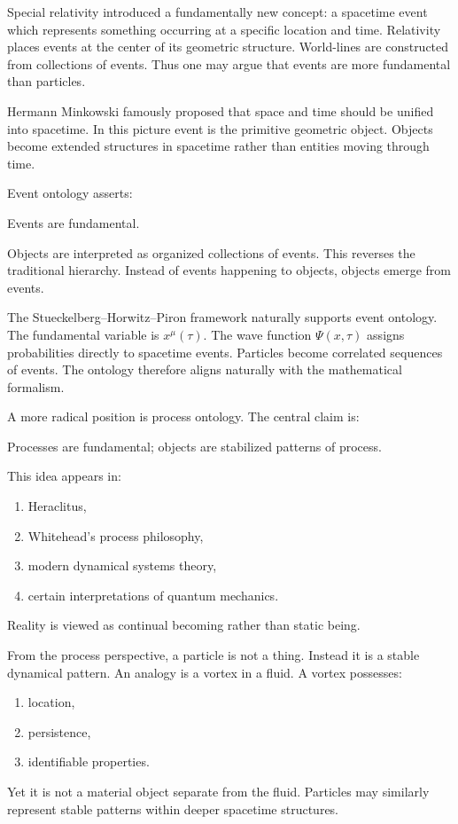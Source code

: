 Special relativity introduced a fundamentally new concept:
a spacetime event which represents something occurring at a specific location and time.
Relativity places events at the center of its geometric structure.
World-lines are constructed from collections of events.
Thus one may argue that events are more fundamental than particles.

Hermann Minkowski famously proposed that space and time should be unified into spacetime.
In this picture event is the primitive geometric object.
Objects become extended structures in spacetime rather than entities 
moving through time.

Event ontology asserts:
\begin{center}
Events are fundamental.
\end{center}
Objects are interpreted as organized collections of events.
This reverses the traditional hierarchy.
Instead of events happening to objects, objects emerge from events.

The Stueckelberg--Horwitz--Piron framework naturally supports event ontology.
The fundamental variable is $x^\mu(\tau).$
The wave function $\Psi(x,\tau)$
assigns probabilities directly to spacetime events.
Particles become correlated sequences of events.
The ontology therefore aligns naturally with the mathematical formalism.

A more radical position is process ontology.
The central claim is:
\begin{center}
Processes are fundamental; objects are stabilized patterns of process.
\end{center}
This idea appears in:
\begin{enumerate}
\item Heraclitus,
\item Whitehead's process philosophy,
\item modern dynamical systems theory,
\item certain interpretations of quantum mechanics.
\end{enumerate}
Reality is viewed as continual becoming rather than static being.

From the process perspective, a particle is not a thing.
Instead it is a stable dynamical pattern.
An analogy is a vortex in a fluid.
A vortex possesses:
\begin{enumerate}
\item location,
\item persistence,
\item identifiable properties.
\end{enumerate}
Yet it is not a material object separate from the fluid.
Particles may similarly represent stable patterns within deeper spacetime structures.

